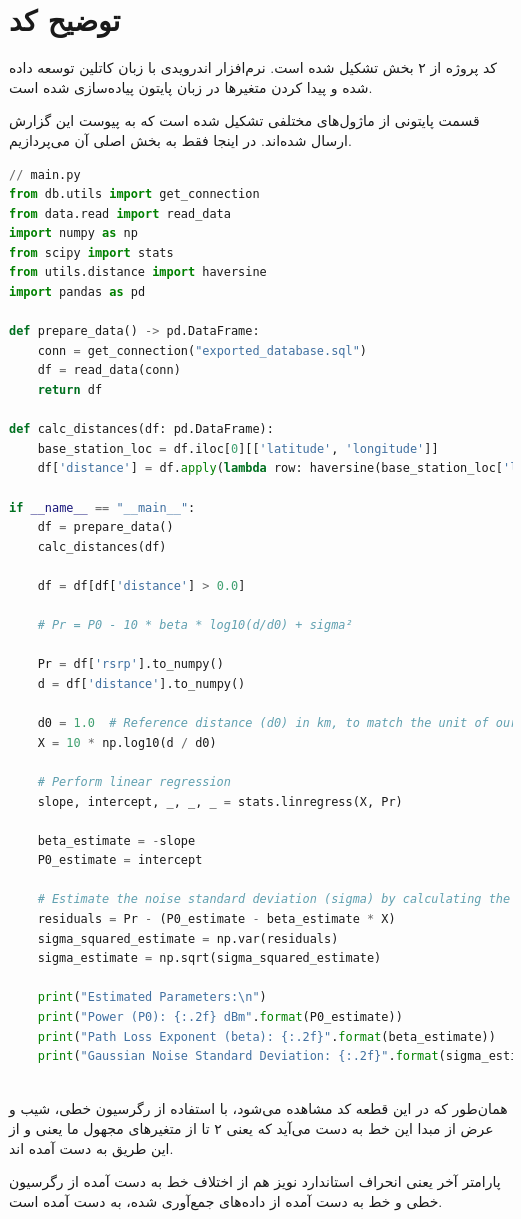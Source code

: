 \section{توضیح کد}
	
کد پروژه از ۲ بخش تشکیل شده است. نرم‌افزار اندرویدی با زبان کاتلین توسعه داده‌ شده و پیدا کردن متغیرها در زبان پایتون پیاده‌سازی شده است. 

قسمت پایتونی از ماژول‌های مختلفی تشکیل شده است که به پیوست این گزارش ارسال شده‌اند. در اینجا فقط به بخش اصلی آن می‌پردازیم.	

\begin{lstlisting}[language=Python]
// main.py
from db.utils import get_connection
from data.read import read_data
import numpy as np
from scipy import stats
from utils.distance import haversine
import pandas as pd

def prepare_data() -> pd.DataFrame:
	conn = get_connection("exported_database.sql")
	df = read_data(conn)
	return df

def calc_distances(df: pd.DataFrame):
	base_station_loc = df.iloc[0][['latitude', 'longitude']]
	df['distance'] = df.apply(lambda row: haversine(base_station_loc['latitude'], base_station_loc['longitude'], row['latitude'], row['longitude']), axis=1)

if __name__ == "__main__":
	df = prepare_data()
	calc_distances(df)
	
	df = df[df['distance'] > 0.0]
	
	# Pr = P0 - 10 * beta * log10(d/d0) + sigma²
	
	Pr = df['rsrp'].to_numpy()
	d = df['distance'].to_numpy()
	
	d0 = 1.0  # Reference distance (d0) in km, to match the unit of our calculated distances
	X = 10 * np.log10(d / d0)
	
	# Perform linear regression
	slope, intercept, _, _, _ = stats.linregress(X, Pr)
	
	beta_estimate = -slope
	P0_estimate = intercept
	
	# Estimate the noise standard deviation (sigma) by calculating the residuals
	residuals = Pr - (P0_estimate - beta_estimate * X)
	sigma_squared_estimate = np.var(residuals)
	sigma_estimate = np.sqrt(sigma_squared_estimate)
	
	print("Estimated Parameters:\n")
	print("Power (P0): {:.2f} dBm".format(P0_estimate))
	print("Path Loss Exponent (beta): {:.2f}".format(beta_estimate))
	print("Gaussian Noise Standard Deviation: {:.2f}".format(sigma_estimate))
	
\end{lstlisting}

همان‌طور که در این قطعه کد مشاهده می‌شود، با استفاده از رگرسیون خطی، شیب و عرض از مبدا این خط به دست می‌آید که یعنی ۲ تا از متغیرهای مجهول ما یعنی 
\lr{$\beta$}
و
از این طریق به دست آمده اند. 

پارامتر آخر یعنی انحراف استاندارد نویز هم از اختلاف خط به دست آمده از رگرسیون خطی و خط به دست آمده از داده‌های جمع‌آوری شده، به دست آمده است.

